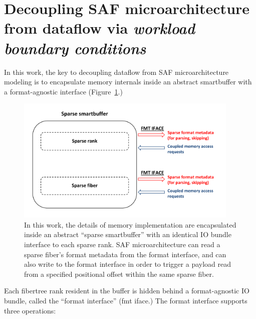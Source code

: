 \section{Decoupling SAF microarchitecture from dataflow via \textit{workload boundary conditions}}

In this work, the key to decoupling dataflow from SAF microarchitecture modeling is to encapsulate memory internals inside an abstract smartbuffer with a format-agnostic interface (Figure~\ref{fig:sparse_sbuff_overview}.) 

\begin{figure}[ht]
    \centering
    \includegraphics[width=0.95\textwidth]{figures/sparse_sbuff_overview.pdf}
    \caption{In this work, the details of memory implementation are encapsulated inside an abstract ``sparse smartbuffer'' with an identical IO bundle interface to each sparse rank. SAF microarchitecture can read a sparse fiber's format metadata from the format interface, and can also write to the format interface in order to trigger a payload read from a specified positional offset within the same sparse fiber.}
    \label{fig:sparse_sbuff_overview}
\end{figure}

Each fibertree rank resident in the buffer is hidden behind a format-agnostic IO bundle, called the ``format interface'' (fmt iface.) The format interface supports three operations:

